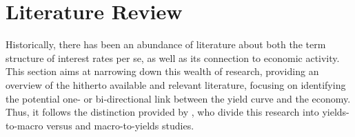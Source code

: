 \section{Literature Review}
\label{sec:lit_rev}

Historically, there has been an abundance of literature about both the term structure of interest rates per se, as well as its connection to economic activity. 
This section aims at narrowing down this wealth of research, 
providing an overview of the hitherto available and relevant literature, focusing on identifying the potential one- or bi-directional link between the yield curve and the economy. Thus, it follows the distinction provided by \citet{diebold2006macroeconomy}, who divide this research into yields-to-macro versus and macro-to-yields studies. 




